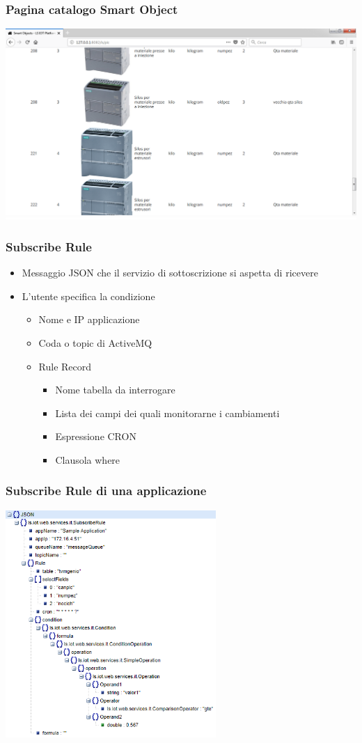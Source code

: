 \documentclass{beamer}
\begin{document}
\begin{frame}
\frametitle{Pagina catalogo Smart Object}
\includegraphics[width=1\textwidth]{images/SmartObjectsPlatform.png}
\end{frame}

\begin{frame}
\frametitle{Subscribe Rule}
\begin{itemize}
\item Messaggio JSON che il servizio di sottoscrizione si aspetta di ricevere
\item L'utente specifica la condizione
\begin{itemize}
\item Nome e IP applicazione
\item Coda o topic di ActiveMQ
\item Rule Record
\begin{itemize}
\item Nome tabella da interrogare
\item Lista dei campi dei quali monitorarne i cambiamenti
\item Espressione CRON
\item Clausola where

\end{itemize}
\end{itemize}
\end{itemize}
\end{frame}



\begin{frame}
\frametitle{Subscribe Rule di una applicazione}
\includegraphics[width=0.6\textwidth]{images/subscribe-json-1.png}
\end{frame}
\end{document}
